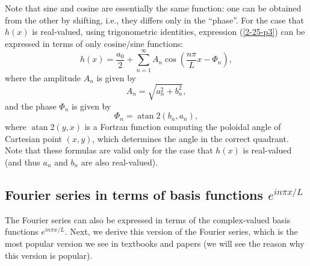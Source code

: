 \documentclass{article}
\newcommand{\tmop}[1]{\ensuremath{\operatorname{#1}}}
\begin{document}
Note that sine and cosine are essentially the same function: one can be
obtained from the other by shifting, i.e., they differs only in the ``phase''.
For the case that $h (x)$ is real-valued, using trigonometric identities,
expression (\ref{2-25-p3}) can be expressed in terms of only cosine/sine
functions:
\begin{equation}
  h (x) = \frac{a_0}{2} + \sum_{n = 1}^{\infty} A_n \cos \left( \frac{n
  \pi}{L} x - \Phi_n \right),
\end{equation}
where the amplitude $A_n$ is given by
\begin{equation}
  \label{20-12-16-a1} A_n = \sqrt{a_n^2 + b_n^2},
\end{equation}
and the phase $\Phi_n$ is given by
\begin{equation}
  \label{20-12-19-a1} \Phi_n = \tmop{atan} 2 (b_n, a_n),
\end{equation}
where $\tmop{atan} 2 (y, x)$ is a Fortran function computing the poloidal
angle of Cartesian point $(x, y)$, which determines the angle in the correct
quadrant. Note that these formulas are valid only for the case that $h (x)$ is
real-valued (and thus $a_n$ and $b_n$ are also real-valued).

\subsection{Fourier series in terms of basis functions $e^{i n \pi x / L}$}

The Fourier series can also be expressed in terms of the complex-valued basis
functions $e^{i n \pi x / L}$. Next, we derive this version of the Fourier
series, which is the most popular version we see in textbooks and papers (we
will see the reason why this version is popular).
\end{document}
